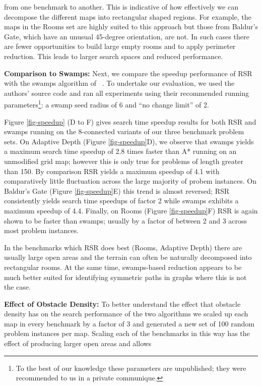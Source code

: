 from one benchmark to another. This is indicative of how effectively we can 
decompose the different maps into rectangular shaped regions.
For example, the maps in the Rooms set are highly suited to this approach but those
from Baldur's Gate, which have an unusual 45-degree orientation, are not.
In such cases there are fewer opportunities to build large empty rooms and to apply perimeter reduction.
This leads to larger search spaces and reduced performance. 
\par
\textbf{Comparison to Swamps:}
Next, we compare the speedup performance of RSR with the swamps algorithm
of \citeauthor{pochter10}~.
To undertake our evaluation, we used the authors' source code and ran all experiments 
using their recommended running parameters\footnote{To the best of our knowledge 
these parameters are unpublished; they were recommended to us in a private communique.}:
 a swamp seed radius of 6 and ``no change limit'' of 2.
\par
Figure \ref{fig-speedup} (D to F) gives search time speedup results for both 
RSR and swamps running on the 8-connected variants of our three benchmark 
problem sets. 
On Adaptive Depth (Figure \ref{fig-speedup}D), we observe that 
swamps yields a maximum search time speedup of 2.8 times faster than 
 A* running on an unmodified grid map; however this is only true for problems of length greater than 150.
By comparison RSR yields a maximum speedup of 4.1 with comparatively little fluctuation across the
large majority of probem instances.
On Baldur's Gate (Figure \ref{fig-speedup}E) this trend is almost reversed; RSR consistently 
yields search time speedups of factor 2 while swamps exhibits a maximum speedup of 4.4.
Finally, on Rooms (Figure \ref{fig-speedup}F) RSR is again shown to be faster than swamps;
usually by a factor of between 2 and 3 across most problem instances.
\par
In the benchmarks which RSR does best (Rooms, Adaptive Depth) 
there are usually large open areas and the terrain can often be naturally decomposed into rectangular rooms.
At the same time, swamps-based reduction appears to be much better suited for identifying symmetric paths 
in graphs where this is not the case.
\par
\textbf{Effect of Obstacle Density:}
To better understand the effect that obstacle density has on the search performance of the two algorithms
we scaled up each map in every benchmark by a factor of 3 and generated a new
set of 100 random problem instances per map.
Scaling each of the benchmarks in this way has the effect of producing larger open areas and allows 
